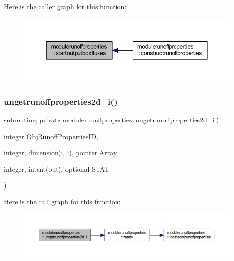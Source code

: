 Here is the caller graph for this function\+:\nopagebreak
\begin{figure}[H]
\begin{center}
\leavevmode
\includegraphics[width=350pt]{namespacemodulerunoffproperties_a06106b336b804481c4fd8b518bb683fe_icgraph}
\end{center}
\end{figure}
\mbox{\label{namespacemodulerunoffproperties_af2f8fff6028d006b30f2d2c823a5e384}} 
\subsubsection{\texorpdfstring{ungetrunoffproperties2d\+\_\+i()}{ungetrunoffproperties2d\_i()}}
{\footnotesize\ttfamily subroutine, private modulerunoffproperties\+::ungetrunoffproperties2d\+\_\+i (\begin{DoxyParamCaption}\item[{integer}]{Obj\+Runoff\+Properties\+ID,  }\item[{integer, dimension(\+:, \+:), pointer}]{Array,  }\item[{integer, intent(out), optional}]{S\+T\+AT }\end{DoxyParamCaption})\hspace{0.3cm}{\ttfamily [private]}}

Here is the call graph for this function\+:\nopagebreak
\begin{figure}[H]
\begin{center}
\leavevmode
\includegraphics[width=350pt]{namespacemodulerunoffproperties_af2f8fff6028d006b30f2d2c823a5e384_cgraph}
\end{center}
\end{figure}
\mbox{\label{namespacemodulerunoffproperties_a85270cee7ca1e6d07d2853a9380f1987}} 
